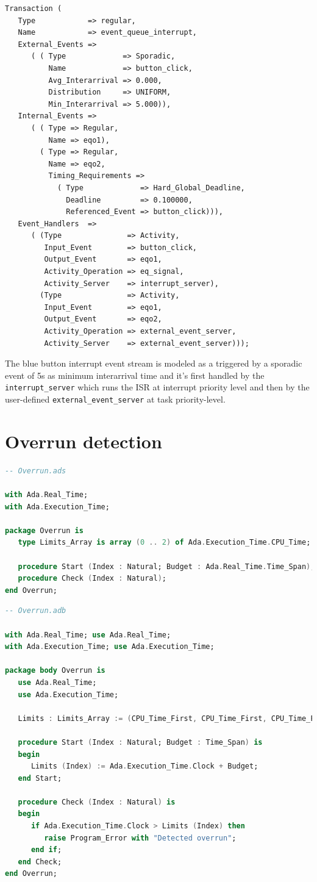\documentclass{article}
\begin{document}
\begin{lstlisting}
Transaction (
   Type            => regular,
   Name            => event_queue_interrupt,
   External_Events =>
      ( ( Type             => Sporadic,
          Name             => button_click,
          Avg_Interarrival => 0.000,
          Distribution     => UNIFORM,
          Min_Interarrival => 5.000)),
   Internal_Events =>
      ( ( Type => Regular,
          Name => eqo1),
        ( Type => Regular,
          Name => eqo2,
          Timing_Requirements =>
            ( Type             => Hard_Global_Deadline,
              Deadline         => 0.100000,
              Referenced_Event => button_click))),
   Event_Handlers  =>
      ( (Type               => Activity,
         Input_Event        => button_click,
         Output_Event       => eqo1,
         Activity_Operation => eq_signal,
         Activity_Server    => interrupt_server),
        (Type               => Activity,
         Input_Event        => eqo1,
         Output_Event       => eqo2,
         Activity_Operation => external_event_server,
         Activity_Server    => external_event_server)));
\end{lstlisting}

The blue button interrupt event stream is modeled as a triggered by a sporadic event of 5s as minimum interarrival time and it's first handled by the \texttt{interrupt\_server} which runs the ISR at interrupt priority level and then by the user-defined \texttt{external\_event\_server} at task priority-level.

\section{Overrun detection}

\begin{lstlisting}[language=Ada]
-- Overrun.ads

with Ada.Real_Time;
with Ada.Execution_Time;

package Overrun is
   type Limits_Array is array (0 .. 2) of Ada.Execution_Time.CPU_Time;

   procedure Start (Index : Natural; Budget : Ada.Real_Time.Time_Span);
   procedure Check (Index : Natural);
end Overrun;
\end{lstlisting}

\begin{lstlisting}[language=Ada]
-- Overrun.adb

with Ada.Real_Time; use Ada.Real_Time;
with Ada.Execution_Time; use Ada.Execution_Time;

package body Overrun is
   use Ada.Real_Time;
   use Ada.Execution_Time;

   Limits : Limits_Array := (CPU_Time_First, CPU_Time_First, CPU_Time_First);

   procedure Start (Index : Natural; Budget : Time_Span) is
   begin
      Limits (Index) := Ada.Execution_Time.Clock + Budget;
   end Start;

   procedure Check (Index : Natural) is
   begin
      if Ada.Execution_Time.Clock > Limits (Index) then
         raise Program_Error with "Detected overrun";
      end if;
   end Check;
end Overrun;
\end{lstlisting}
\end{document}
